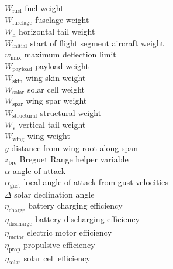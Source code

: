 \begin{multicols}{2}
\begin{tabbing}
$W_{\text{fuel}}$ \> fuel weight \\ %
$W_{\text{fuselage}}$ \> fuselage weight \\ %
$W_{\text{h}}$ \> horizontal tail weight \\ %
$W_{\text{initial}}$ \> start of flight segment aircraft weight \\ %
$w_{\text{max}}$ \> maximum deflection limit \\ %
$W_{\text{payload}}$ \> payload weight \\ %
$W_{\text{skin}}$ \> wing skin weight \\ %
$W_{\text{solar}}$ \> solar cell weight \\ %
$W_{\text{spar}}$ \> wing spar weight \\ %
$W_{\text{structural}}$ \> structural weight \\ %
$W_{\text{v}}$ \> vertical tail weight \\ %
$W_{\text{wing}}$ \> wing weight \\ %
$y$ \> distance from wing root along span \\ %
$z_{\text{bre}}$ \> Breguet Range helper variable \\
$\alpha$ \> angle of attack \\
$\alpha_{\text{gust}}$ \> local angle of attack from gust velocities \\ %
$\Delta$ \> solar declination angle \\
$\eta_{\text{charge}}$ \> battery charging efficiency \\
$\eta_{\text{discharge}}$ \> battery discharging efficiency \\
$\eta_{\text{motor}}$ \> electric motor efficiency \\
$\eta_{\text{prop}}$ \> propulsive efficiency \\
$\eta_{\text{solar}}$ \> solar cell efficiency \\

\end{tabbing}
\end{multicols}
